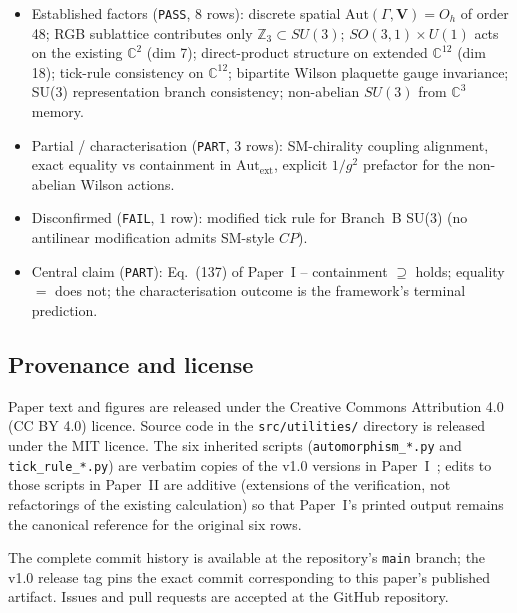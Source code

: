 \begin{itemize}
\item Established factors (\texttt{PASS}, $8$ rows): discrete
  spatial $\mathrm{Aut}(\Gamma, \mathbf{V}) = O_h$ of order 48;
  RGB sublattice contributes only $\mathbb{Z}_3 \subset SU(3)$;
  $SO(3,1) \times U(1)$ acts on the existing $\mathbb{C}^2$
  (dim 7); direct-product structure on extended $\mathbb{C}^{12}$
  (dim 18); tick-rule consistency on $\mathbb{C}^{12}$; bipartite
  Wilson plaquette gauge invariance; SU(3) representation branch
  consistency; non-abelian $SU(3)$ from $\mathbb{C}^3$ memory.
\item Partial / characterisation (\texttt{PART}, $3$ rows):
  SM-chirality coupling alignment, exact equality vs containment
  in $\mathrm{Aut}_\text{ext}$, explicit $1/g^2$ prefactor for
  the non-abelian Wilson actions.
\item Disconfirmed (\texttt{FAIL}, $1$ row): modified tick rule
  for Branch~B SU(3) (no antilinear modification admits SM-style
  $CP$).
\item Central claim (\texttt{PART}): Eq.~(137) of Paper~I --
  containment $\supseteq$ holds; equality $=$ does not; the
  characterisation outcome is the framework's terminal
  prediction.
\end{itemize}

\subsection{Provenance and license}
\label{subsec:provenance}

Paper text and figures are released under the Creative Commons
Attribution 4.0 (CC BY 4.0) licence.  Source code in the
\nolinkurl{src/utilities/} directory is released under the MIT
licence.  The six inherited scripts (\nolinkurl{automorphism_*.py}
and \nolinkurl{tick_rule_*.py}) are verbatim copies of the v1.0
versions in Paper~I~\cite{menendez2026geometry}; edits to those
scripts in Paper~II are additive (extensions of the verification,
not refactorings of the existing calculation) so that Paper~I's
printed output remains the canonical reference for the original
six rows.

The complete commit history is available at the repository's
\nolinkurl{main} branch; the v1.0 release tag pins the exact
commit corresponding to this paper's published artifact.  Issues
and pull requests are accepted at the GitHub repository.
